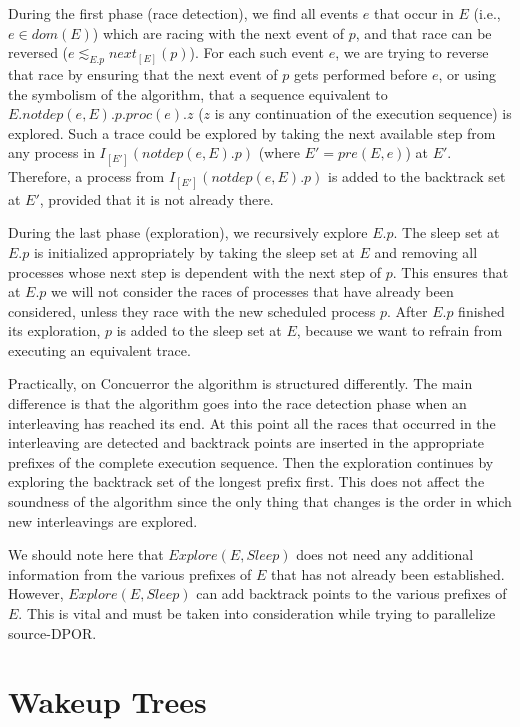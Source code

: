 During the first phase (race detection), we find all events $e$ that occur in $E$ (i.e., $e \in dom(E)$) which are racing
with the next event of $p$, and that race can be reversed ($e \lesssim_{E.p} next_{[E]}(p)$). For each such event $e$, we 
are trying to reverse that race by ensuring that the next event of $p$ gets performed before $e$, or using the symbolism
of the algorithm, that a sequence equivalent to $E.notdep(e,E).p.proc(e).z$ ($z$ is any continuation of the execution sequence)
is explored.
Such a trace could be explored by taking the next available step from any process in $I_{[E']}(notdep(e,E).p)$ (where $E'=pre(E,e)$)
at $E'$. Therefore, a process from $I_{[E']}(notdep(e,E).p)$ is added to the backtrack set  at $E'$, provided that it is not already there.

During the last phase (exploration), we recursively explore $E.p$. The sleep set at $E.p$ is initialized appropriately 
by taking the sleep set at $E$ and removing all processes whose next step is dependent with the next step of $p$. This ensures
that at $E.p$ we will not consider the races of processes that have already been considered, unless they race with the new
scheduled process $p$. After $E.p$ finished its exploration, $p$ is added to the sleep set at $E$,
because we want to refrain from executing an equivalent trace.

Practically, on Concuerror the algorithm is structured differently. The main difference is that the algorithm goes into the race
detection phase when an interleaving has reached its end. At this point all the races that occurred in the interleaving
are detected and backtrack points are inserted in the appropriate prefixes of the complete execution sequence. Then the exploration
continues by exploring the backtrack set of the longest prefix first. This does not affect the soundness of the algorithm 
since the only thing that changes is the order in which new interleavings are explored.

We should note here that $Explore(E, Sleep)$ does not need any additional information from the various prefixes of $E$ that
has not already been established. However, $Explore(E, Sleep)$ can add backtrack points to the various prefixes of $E$. This
is vital and must be taken into consideration while trying to parallelize source-DPOR.

\section{Wakeup Trees}

